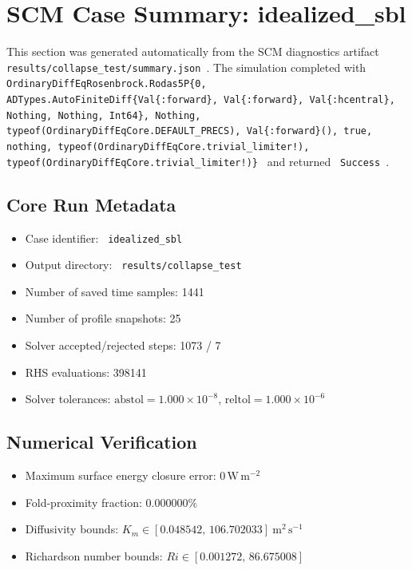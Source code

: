 \section{SCM Case Summary: idealized\_sbl}
\label{sec:scm_case_collapse_test_idealized_sbl_120x1m_12h_report}

This section was generated automatically from the SCM diagnostics artifact
\texttt{ results/collapse\_test/summary.json }. The simulation completed with \texttt{ OrdinaryDiffEqRosenbrock.Rodas5P\{0, ADTypes.AutoFiniteDiff\{Val\{:forward\}, Val\{:forward\}, Val\{:hcentral\}, Nothing, Nothing, Int64\}, Nothing, typeof(OrdinaryDiffEqCore.DEFAULT\_PRECS), Val\{:forward\}(), true, nothing, typeof(OrdinaryDiffEqCore.trivial\_limiter!), typeof(OrdinaryDiffEqCore.trivial\_limiter!)\} }
and returned \texttt{ Success }.

\subsection{Core Run Metadata}
\begin{itemize}
  \item Case identifier: \texttt{ idealized\_sbl }
  \item Output directory: \texttt{ results/collapse\_test }
  \item Number of saved time samples: 1441
  \item Number of profile snapshots: 25
  \item Solver accepted/rejected steps: 1073 / 7
  \item RHS evaluations: 398141
  \item Solver tolerances: $\mathrm{abstol}=1.000 \times 10^{-8}$, $\mathrm{reltol}=1.000 \times 10^{-6}$
\end{itemize}

\subsection{Numerical Verification}
\begin{itemize}
  \item Maximum surface energy closure error:
  $0\,\mathrm{W\,m^{-2}}$
  \item Fold-proximity fraction:
  $0.000000\%$
  \item Diffusivity bounds:
  $K_m \in [0.048542,\,106.702033]~\mathrm{m^2\,s^{-1}}$
  \item Richardson number bounds:
  $Ri \in [0.001272,\,86.675008]$
\end{itemize}

